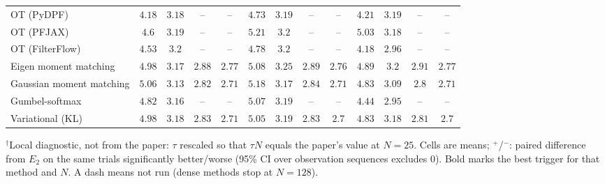 \begin{table}[ht]
\begin{adjustbox}{max width=\linewidth}
\begin{tabular}{lcccc|cccc|cccc}
OT (PyDPF) & $\mathbf{4.18}$ & $\mathbf{3.18}$ & -- & -- & $4.73$ & $3.19$ & -- & -- & $4.21$ & $3.19$ & -- & -- \\
OT (PFJAX) & $\mathbf{4.6}$ & $3.19$ & -- & -- & $5.21$ & $3.2$ & -- & -- & $5.03$ & $\mathbf{3.18}$ & -- & -- \\
OT (FilterFlow) & $4.53$ & $3.2$ & -- & -- & $4.78$ & $3.2$ & -- & -- & $\mathbf{4.18}$ & $\mathbf{2.96}$ & -- & -- \\
Eigen moment matching & $4.98$ & $\mathbf{3.17}$ & $\mathbf{2.88}$ & $2.77$ & $5.08$ & $3.25$ & $2.89$ & $\mathbf{2.76}$ & $\mathbf{4.89}$ & $3.2$ & $2.91$ & $2.77$ \\
Gaussian moment matching & $5.06$ & $3.13$ & $2.82$ & $\mathbf{2.71}$ & $5.18$ & $3.17$ & $2.84$ & $2.71$ & $\mathbf{4.83}$ & $\mathbf{3.09}$ & $\mathbf{2.8}$ & $2.71$ \\
Gumbel-softmax & $4.82$ & $3.16$ & -- & -- & $5.07$ & $3.19$ & -- & -- & $\mathbf{4.44}$ & $\mathbf{2.95}$ & -- & -- \\
Variational (KL) & $4.98$ & $\mathbf{3.18}$ & $2.83$ & $2.71$ & $5.05$ & $3.19$ & $2.83$ & $\mathbf{2.7}$ & $\mathbf{4.83}$ & $3.18$ & $\mathbf{2.81}$ & $2.7$ \\
\bottomrule
\end{tabular}
\end{adjustbox}
\par\smallskip\parbox{0.95\linewidth}{\footnotesize $^\dagger$Local diagnostic, not from the paper: $\tau$ rescaled so that $\tau N$ equals the paper's value at $N{=}25$. Cells are means; $^{+}$/$^{-}$: paired difference from $E_2$ on the same trials significantly better/worse (95\% CI over observation sequences excludes 0). Bold marks the best trigger for that method and $N$. A dash means not run (dense methods stop at $N{=}128$).}
\end{table}

